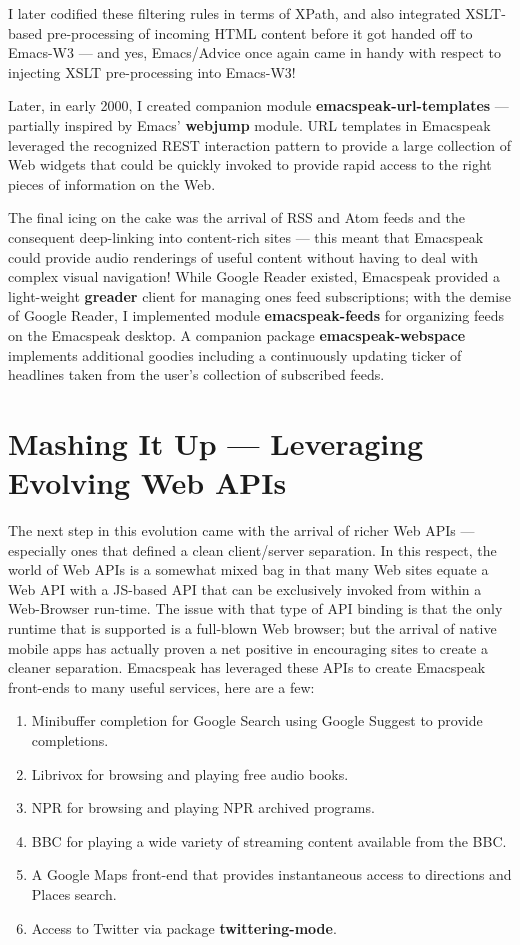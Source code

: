 \documentclass[11pt]{article}
\begin{document}
I later codified these filtering rules in terms of XPath, and
also integrated XSLT-based pre-processing of incoming HTML
content before it got handed off to Emacs-W3 — and yes,
Emacs/Advice once again came in handy with respect to injecting
XSLT pre-processing into Emacs-W3!

Later, in early 2000, I created companion module
\textbf{emacspeak-url-templates} — partially inspired by Emacs'
\textbf{webjump} module. URL templates in Emacspeak leveraged the
recognized REST interaction pattern to provide a large collection
of Web widgets that could be quickly invoked to provide rapid
access to the right pieces of information on the Web.

The final icing on the cake was the arrival of RSS and Atom feeds
and the consequent deep-linking into content-rich sites — this
meant that Emacspeak could provide audio renderings of useful
content without having to deal with complex visual navigation!
While Google Reader existed, Emacspeak provided a light-weight
\textbf{greader} client for managing ones feed subscriptions; with the
demise of Google Reader, I implemented module \textbf{emacspeak-feeds}
for organizing feeds on the Emacspeak desktop. A companion
package \textbf{emacspeak-webspace} implements additional goodies
including a continuously updating ticker of headlines taken from
the user's collection of subscribed feeds.


\section{Mashing It Up —  Leveraging Evolving Web APIs}
\label{sec-15}

The next step in this evolution came with the arrival of richer
Web APIs — especially ones that defined a clean client/server
separation. In this respect, the world of Web APIs is a somewhat
mixed bag in that many Web sites equate a Web API with a JS-based
API that can be exclusively invoked from within a Web-Browser
run-time. The issue with that type of API binding is that the
only runtime that is supported is a full-blown Web browser; but
the arrival of native mobile apps has actually proven a net
positive in encouraging sites to create a cleaner
separation. Emacspeak has leveraged these APIs to create
Emacspeak front-ends to many useful services, here are a few:

\begin{enumerate}
\item Minibuffer completion for Google Search using Google Suggest
to provide completions.
\item Librivox for browsing  and playing free audio books.
\item NPR  for browsing and playing NPR archived programs.
\item BBC for playing a wide variety of streaming content
available from the BBC.
\item A Google Maps front-end that  provides instantaneous access
to directions and Places search.
\item Access to Twitter via package \textbf{twittering-mode}.
\end{enumerate}
\end{document}
